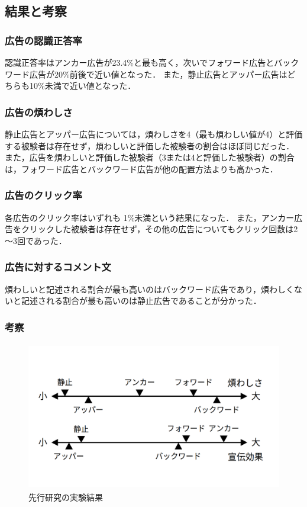 \documentclass[12pt,a4j,titlepage]{ltjsarticle}
\begin{document}
\subsection{結果と考察}
\subsubsection{広告の認識正答率}
認識正答率はアンカー広告が23.4\%と最も高く，次いでフォワード広告とバックワード広告が20\%前後で近い値となった．
また，静止広告とアッパー広告はどちらも10\%未満で近い値となった．

\subsubsection{広告の煩わしさ}
静止広告とアッパー広告については，煩わしさを4（最も煩わしい値が4）と評価する被験者は存在せず，煩わしいと評価した被験者の割合はほぼ同じだった．
また，広告を煩わしいと評価した被験者（3または4と評価した被験者）の割合は，フォワード広告とバックワード広告が他の配置方法よりも高かった．

\subsubsection{広告のクリック率}
各広告のクリック率はいずれも 1\%未満という結果になった．
また，アンカー広告をクリックした被験者は存在せず，その他の広告についてもクリック回数は2～3回であった．

\subsubsection{広告に対するコメント文}
煩わしいと記述される割合が最も高いのはバックワード広告であり，煩わしくないと記述される割合が最も高いのは静止広告であることが分かった．

\subsubsection{考察}
\begin{figure}[h]
\begin{center}
 \includegraphics[height=65mm]{figures/先行研究結果.pdf}
\end{center}
 \caption{先行研究の実験結果}
 \label{fig:先行研究結果}
\end{figure}
\end{document}
